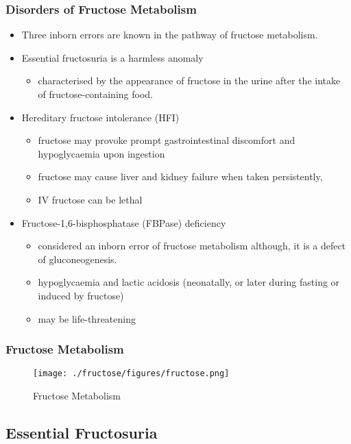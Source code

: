 \documentclass{scrartcl}
\begin{document}
\subsubsection{Disorders of Fructose Metabolism}
\label{sec:org73f73e2}
\begin{itemize}
\item Three inborn errors are known in the pathway of fructose metabolism.
\item Essential fructosuria is a harmless anomaly
\begin{itemize}
\item characterised by the appearance of fructose in the urine after the intake of fructose-containing food.
\end{itemize}
\item Hereditary fructose intolerance (HFI)
\begin{itemize}
\item fructose may provoke prompt gastrointestinal discomfort and hypoglycaemia upon ingestion
\item fructose may cause liver and kidney failure when taken persistently,
\item IV fructose can be lethal
\end{itemize}
\item Fructose-1,6-bisphosphatase (FBPase) deficiency
\begin{itemize}
\item considered an inborn error of fructose metabolism although, it is a defect of gluconeogenesis.
\item hypoglycaemia and lactic acidosis (neonatally, or later during fasting or induced by fructose)
\item may be life-threatening
\end{itemize}
\end{itemize}

\subsubsection{Fructose Metabolism}
\label{sec:orgeb7dfd3}
\begin{figure}[htbp]
\centering
\texttt{[image: ./fructose/figures/fructose.png]}
\caption[Fructose]{\label{fig:org59c5748}
Fructose Metabolism}
\end{figure}
\subsection{Essential Fructosuria}
\label{sec:org5fc23fe}
\end{document}
